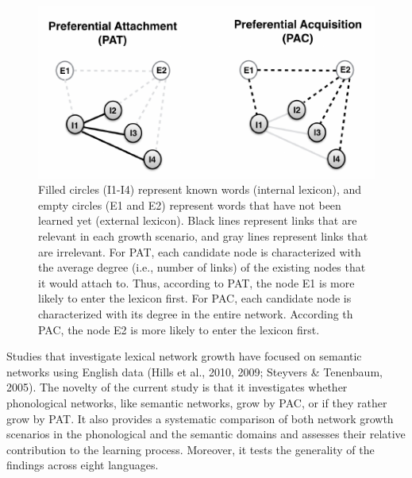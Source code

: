 \documentclass[10pt, letterpaper]{article}
\newenvironment{CodeChunk}{}{}
\begin{document}
\begin{CodeChunk}
\begin{figure}[H]

{\centering \includegraphics{figs/growth-1} 

}

\caption{\label{fig:growth}Filled circles (I1-I4) represent known words (internal lexicon), and empty circles (E1 and E2) represent words that have not been learned yet (external lexicon). Black lines represent links that are relevant in each growth scenario, and gray lines represent links that are irrelevant. For PAT, each candidate node is characterized with the average degree (i.e., number of links) of the existing nodes that it would attach to. Thus, according to PAT, the node E1 is more likely to enter the lexicon first. For PAC, each candidate node is characterized with its degree in the entire network. According th PAC, the node E2 is more likely to enter the lexicon first.}\label{fig:growth}
\end{figure}
\end{CodeChunk}

Studies that investigate lexical network growth have focused on semantic
networks using English data (Hills et al., 2010, 2009; Steyvers \&
Tenenbaum, 2005). The novelty of the current study is that it
investigates whether phonological networks, like semantic networks, grow
by PAC, or if they rather grow by PAT. It also provides a systematic
comparison of both network growth scenarios in the phonological and the
semantic domains and assesses their relative contribution to the
learning process. Moreover, it tests the generality of the findings
across eight languages.
\end{document}
